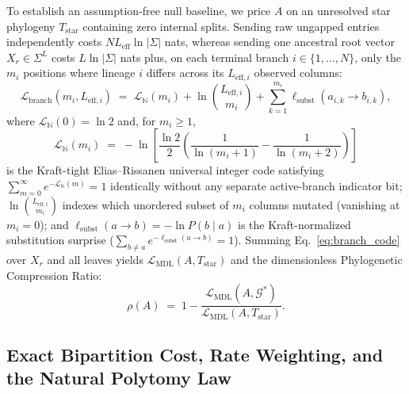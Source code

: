 \documentclass[12pt]{article}
\begin{document}
To establish an assumption-free null baseline, we price $A$ on an unresolved star phylogeny $T_{\text{star}}$ containing zero internal splits. Sending raw ungapped entries independently costs $N L_{\text{eff}}\ln|\Sigma|$ nats, whereas sending one ancestral root vector $X_r \in \Sigma^L$ costs $L\ln|\Sigma|$ nats plus, on each terminal branch $i \in \{1,\dots,N\}$, only the $m_i$ positions where lineage $i$ differs across its $L_{\text{eff},i}$ observed columns:
\begin{equation}
    \mathcal{L}_{\text{branch}}(m_i, L_{\text{eff}, i}) \;=\; \mathcal{L}_{\mathbb{N}}(m_i) + \ln\binom{L_{\text{eff}, i}}{m_i} + \sum_{k=1}^{m_i} \ell_{\text{subst}}(a_{i,k} \to b_{i,k}),
    \label{eq:branch_code}
\end{equation}
where $\mathcal{L}_{\mathbb{N}}(0) = \ln 2$ and, for $m_i \ge 1$,
\[
    \mathcal{L}_{\mathbb{N}}(m_i) \;=\; -\ln\!\left[\frac{\ln 2}{2}\!\left(\frac{1}{\ln(m_i+1)} - \frac{1}{\ln(m_i+2)}\right)\right]
\]
is the Kraft-tight Elias--Rissanen universal integer code \cite{rissanen1983universal} satisfying $\sum_{m=0}^{\infty} e^{-\mathcal{L}_{\mathbb{N}}(m)} = 1$ identically without any separate active-branch indicator bit; $\ln\binom{L_{\text{eff}, i}}{m_i}$ indexes which unordered subset of $m_i$ columns mutated (vanishing at $m_i = 0$); and $\ell_{\text{subst}}(a \to b) = -\ln P(b \mid a)$ is the Kraft-normalized substitution surprise ($\sum_{b \neq a} e^{-\ell_{\text{subst}}(a \to b)} = 1$). Summing Eq.~\eqref{eq:branch_code} over $X_r$ and all leaves yields $\mathcal{L}_{\text{MDL}}(A, T_{\text{star}})$ and the dimensionless Phylogenetic Compression Ratio:
\begin{equation}
    \rho(A) \;=\; 1 - \frac{\mathcal{L}_{\text{MDL}}(A, \mathcal{G}^*)}{\mathcal{L}_{\text{MDL}}(A, T_{\text{star}})}.
    \label{eq:comp_ratio}
\end{equation}

\subsection*{Exact Bipartition Cost, Rate Weighting, and the Natural Polytomy Law}
\end{document}
